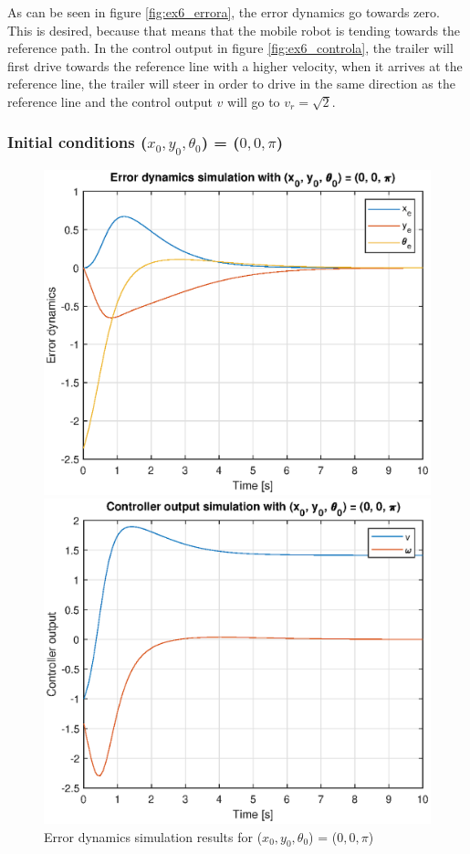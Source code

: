 As can be seen in figure \ref{fig:ex6_errora}, the error dynamics go towards zero. This is desired, because that means that the mobile robot is tending towards the reference path. In the control output in figure \ref{fig:ex6_controla}, the trailer will first drive towards the reference line with a higher velocity, when it arrives at the reference line, the trailer will steer in order to drive in the same direction as the reference line and the control output $v$ will go to $v_r = \sqrt{2}$. 


\subsubsection*{Initial conditions ($x_0, y_0, \theta_0$) = ($0, 0, \pi$)}
\begin{figure}[H]
\begin{minipage}{0.5\textwidth}
    \centering
    \includegraphics[width=\textwidth]{Problems/ex6_errorb.eps}
    \caption{Error dynamics simulation results for ($x_0, y_0, \theta_0$) = ($0, 0, \pi$)}
    \label{fig:ex6_errorb}
\end{minipage}
\begin{minipage}{0.5\textwidth}
    \centering
    \includegraphics[width=\textwidth]{Problems/ex6_controlb.eps}

\end{minipage}
\end{figure}

